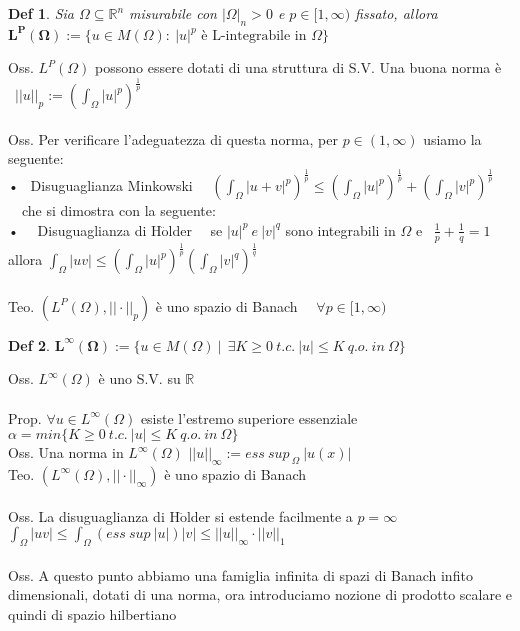 \documentclass{article}
\theoremstyle{unnumbered}
\newtheorem* {theoremT}{Def}
\theoremstyle{unnumbered1}
\newenvironment{defi}{\begin{gBox}\begin{theoremT}}{\end{theoremT}\end{gBox}}
\begin{document}
\begin{defi}
Sia $\Omega\subseteq\mathbb{R}^n$ misurabile con $|\Omega|_n>0$ e $p\in[1,\infty)$ fissato, allora \\ 
$\mathbf{L^P(\Omega)}:=\{u\in M(\Omega): \ |u|^p \text{ è L-integrabile in }\Omega\}$
\end{defi}
%
Oss. $L^P(\Omega)$ possono essere dotati di una struttura di S.V.
Una buona norma è \ $||u||_p:=(\int_{\Omega}|u|^p)^{\frac{1}{p}}$\\ \\
%
Oss. Per verificare l'adeguatezza di questa norma, per $p\in(1,\infty)$ usiamo la seguente:\\
• \ Disuguaglianza Minkowski \ \ $(\int_{\Omega}|u+v|^p)^{\frac{1}{p}}\le(\int_{\Omega}|u|^p)^{\frac{1}{p}} + (\int_{\Omega}|v|^p)^{\frac{1}{p}}$ \ \ che si dimostra con la seguente:\\
• \ \ Disuguaglianza di H$\ddot{\text{o}}$lder \ \ se $|u|^p \ e \ |v|^q$ sono integrabili in $\Omega$ e \ $\frac1p +\frac1q=1$ allora $\int_{\Omega}|uv|\le(\int_{\Omega}|u|^p)^{\frac{1}{p}}(\int_{\Omega}|v|^q)^{\frac{1}{q}}$\\ \\
%
%
Teo. $(L^P(\Omega), ||\cdot||_p)$ è uno spazio di Banach \ \ $\forall p\in[1,\infty)$\\

\begin{defi}
$\mathbf{L^{\infty}(\Omega)}:=\{u\in M(\Omega) \ | \ \ \exists K\ge 0 \ t.c. \ |u|\le K \ q.o. \ in \ \Omega \}$
\end{defi}
%
Oss. $L^{\infty}(\Omega)$ è uno S.V. su $\mathbb{R}$\\ \\
%
%
Prop. $\forall u \in L^{\infty}(\Omega) $ esiste l'estremo superiore essenziale $\alpha=min\{K\ge0 \ t.c. \ |u|\le K \ q.o. \ in \ \Omega\}$\\
Oss. Una norma in $L^{\infty}(\Omega)$ $||u||_{\infty}:= ess\ sup_{\ \Omega}\ |u(x)|$\\
Teo. $(L^{\infty}(\Omega),||\cdot||_{\infty})$ è uno spazio di Banach\\ \\
%
%
Oss. La disuguaglianza di H$\ddot{\text{o}}$lder si estende facilmente a $p=\infty$ \ \ $\int_{\Omega}|uv|\le\int_{\Omega}(ess\ sup \ |u|)|v|\le ||u||_{\infty}\cdot||v||_1$\\ \\
%
%
Oss. A questo punto abbiamo una famiglia infinita di spazi di Banach infito dimensionali, dotati di una norma, ora introduciamo nozione di prodotto scalare e quindi di spazio hilbertiano\\ \\
\end{document}
